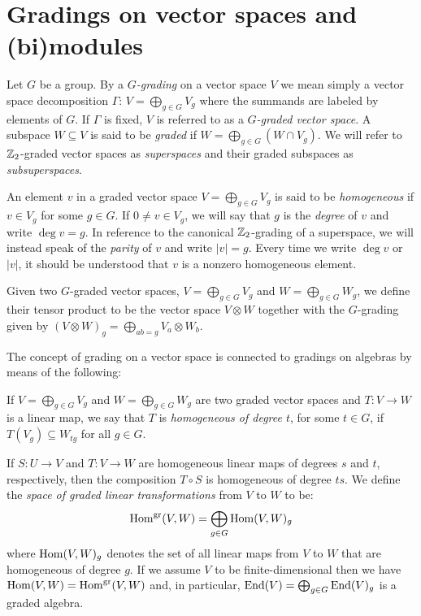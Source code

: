 
\section{Gradings on vector spaces and (bi)modules}\label{sec:graded-bimodules}

Let $G$ be a group. By a \emph{$G$-grading} on a vector space $V$ we mean simply a vector space decomposition $\Gamma:\,V = \bigoplus_{g \in G} V_g$ where the summands are labeled by elements of $G$. If $\Gamma$ is fixed, $V$ is referred to as a {\em $G$-graded vector space}. A subspace $W \subseteq V$ is said to be \emph{graded} if $W = \bigoplus_{g \in G} (W \cap V_g)$. We will refer to $\mathbb{Z}_2$-graded vector spaces as \emph{superspaces} and their graded subspaces as \emph{subsuperspaces}.

An element $v$ in a graded vector space $V = \bigoplus_{g \in G} V_g$ is said to be \emph{homogeneous} if $v\in V_g$ for some $g\in G$.
If $0\ne v\in V_g$, we will say that $g$ is the \emph{degree} of $v$ and write $\deg v = g$.
In reference to the canonical $\mathbb{Z}_2$-grading of a superspace, we will instead speak of the \emph{parity} of $v$ and write $|v| = g$.
Every time we write $\deg v$ or $|v|$, it should be understood that $v$ is a nonzero homogeneous element.

\begin{defi}
	Given two $G$-graded vector spaces, $V=\bigoplus_{g\in G} V_g$ and $W=\bigoplus_{g\in G} W_g$, we define their tensor product to be the vector space $V\otimes W$
	together with the $G$-grading given by $(V \otimes W)_g = \bigoplus_{ab=g} V_{a} \otimes W_{b}$.
\end{defi}

The concept of grading on a vector space is connected to gradings on algebras by means of the following:

\begin{defi}
	If $V=\bigoplus_{g\in G} V_{g}$ and $W=\bigoplus_{g\in G} W_{g}$ are two graded vector spaces and $T: V\rightarrow W$ is a linear map, we say that $T$ is \emph{homogeneous of degree $t$}, for some $t\in G$, if $T(V_g)\subseteq W_{tg}$ for all $g\in G$.
\end{defi}

If $S: U\rightarrow V$ and $T: V\rightarrow W$ are homogeneous linear maps of degrees $s$ and $t$, respectively,
then the composition $T\circ S$ is homogeneous of degree $ts$.
We define the {\em space of graded linear transformations} from $V$ to $W$ to be:
%
\[ \operatorname{Hom}^{\text{gr}} (V,W) = \bigoplus_{g\in G} \operatorname{Hom} (V,W)_{g}\]
%
where $\operatorname{Hom} (V,W)_{g}$ denotes the set of all linear maps from $V$ to $W$ that are homogeneous of degree $g$.
If we assume $V$ to be finite-dimensional then we have $\operatorname{Hom}(V,W)=\operatorname{Hom}^{\text{gr}}(V,W)$ and, in particular, $\operatorname{End} (V) = \bigoplus_{g\in G} \operatorname{End} (V)_g$ is a graded algebra.

